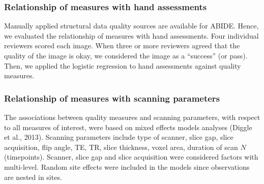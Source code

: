 \subsubsection{Relationship of measures with hand assessments}
\label{sec:27}
Manually applied structural data quality sources are available for ABIDE. Hence, we evaluated the relationship of measures with hand assessments. Four individual reviewers scored each image. When three or more reviewers agreed that the quality of the image is okay, we considered the image as a ``success'' (or pass). Then, we applied the logistic regression to hand assessments against quality measures.

\subsubsection{Relationship of measures with scanning parameters}
The associations between quality measures and scanning parameters, with respect to all measures of interest, were based on mixed effects models analyses (Diggle et al., 2013). Scanning parameters include type of scanner, slice gap, slice acquisition, flip angle, TE, TR, slice thickness, voxel area, duration of scan $N$ (timepoints). Scanner, slice gap and slice acquisition were considered factors with multi-level. Random site effects were included in the models since observations are nested in sites.
